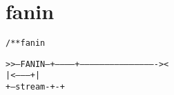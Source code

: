 \section{fanin}
\begin{shaded}
\begin{alltt}
/** fanin

   >>--FANIN--+------------+----------------------------------------------><
              | <--------+ |
              +---stream-+-+
\end{alltt}
\end{shaded}
